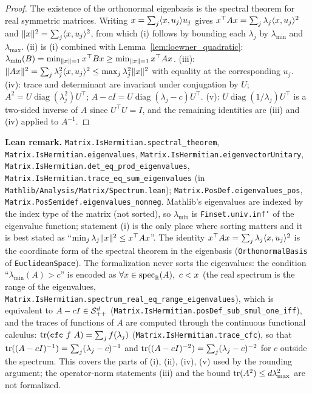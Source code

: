 \begin{proof}
The existence of the orthonormal eigenbasis is the spectral theorem for real symmetric
matrices. Writing $x = \sum_j \langle x, u_j \rangle u_j$ gives $x^\top A x = \sum_j \lambda_j \langle x, u_j \rangle^2$
and $\lVert x \rVert^2 = \sum_j \langle x, u_j \rangle^2$, from which (i) follows by bounding each $\lambda_j$ by
$\lambda_{\min}$ and $\lambda_{\max}$. (ii) is (i) combined with
Lemma~\ref{lem:loewner_quadratic}: $\lambda_{\min}(B) = \min_{\lVert x \rVert=1} x^\top B x \ge
\min_{\lVert x \rVert=1} x^\top A x$. (iii): $\lVert Ax \rVert^2 = \sum_j \lambda_j^2 \langle x, u_j \rangle^2 \le
\max_j \lambda_j^2 \lVert x \rVert^2$ with equality at the corresponding $u_j$. (iv): trace and
determinant are invariant under conjugation by $U$; $A^2 = U\operatorname{diag}(\lambda_j^2)U^\top$;
$A - cI = U\operatorname{diag}(\lambda_j - c)U^\top$. (v): $U\operatorname{diag}(1/\lambda_j)U^\top$
is a two-sided inverse of $A$ since $U^\top U = I$, and the remaining identities are (iii) and
(iv) applied to $A^{-1}$.
\end{proof}

\textbf{Lean remark.} \texttt{Matrix.IsHermitian.spectral\_theorem},
\texttt{Matrix.IsHermitian.eigenvalues}, \texttt{Matrix.IsHermitian.eigenvectorUnitary},
\texttt{Matrix.IsHermitian.det\_eq\_prod\_eigenvalues},
\texttt{Matrix.IsHermitian.trace\_eq\_sum\_eigenvalues} (in
\texttt{Mathlib/Analysis/Matrix/Spectrum.lean}); \texttt{Matrix.PosDef.eigenvalues\_pos},
\texttt{Matrix.PosSemidef.eigenvalues\_nonneg}. Mathlib's eigenvalues are indexed by the
index type of the matrix (not sorted), so $\lambda_{\min}$ is
\texttt{Finset.univ.inf'} of the eigenvalue function; statement (i) is the only place where
sorting matters and it is best stated as ``$\min_j \lambda_j \lVert x \rVert^2 \le x^\top A x$''.
The identity $x^\top A x = \sum_j \lambda_j \langle x, u_j \rangle^2$ is the coordinate form of the
spectral theorem in the eigenbasis (\texttt{OrthonormalBasis} of \texttt{EuclideanSpace}).
The formalization never sorts the eigenvalues: the condition ``$\lambda_{\min}(A) > c$'' is
encoded as $\forall x \in \operatorname{spec}_{\mathbb{R}}(A),\ c < x$ (the real spectrum is the range
of the eigenvalues, \texttt{Matrix.IsHermitian.spectrum\_real\_eq\_range\_eigenvalues}), which
is equivalent to $A - cI \in \mathcal{S}_{++}^{d}$ (\texttt{Matrix.IsHermitian.posDef\_sub\_smul\_one\_iff}), and
the traces of functions of $A$ are computed through the continuous functional calculus:
$\operatorname{tr}(\texttt{cfc}\ f\ A) = \sum_j f(\lambda_j)$ (\texttt{Matrix.IsHermitian.trace\_cfc}), so that
$\operatorname{tr}((A - cI)^{-1}) = \sum_j (\lambda_j - c)^{-1}$ and $\operatorname{tr}((A-cI)^{-2}) = \sum_j(\lambda_j - c)^{-2}$
for $c$ outside the spectrum. This covers the parts of (i), (ii), (iv), (v) used by the rounding
argument; the operator-norm statements (iii) and the bound $\operatorname{tr}(A^2) \le d\lambda_{\max}^2$ are not
formalized.

